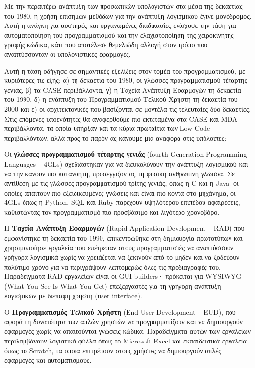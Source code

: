        Με την περαιτέρω ανάπτυξη των προσωπικών υπολογιστών στα μέσα της δεκαετίας του 1980, η χρήση επίσημων μεθόδων για την ανάπτυξη λογισμικού έγινε μονόδρομος. Αυτή η ανάγκη για αυστηρές και οργανωμένες διαδικασίες ενίσχυσε την τάση για αυτοματοποίηση του προγραμματισμού και την ελαχιστοποίηση της χειροκίνητης γραφής κώδικα, κάτι που αποτέλεσε θεμελιώδη αλλαγή στον τρόπο που αναπτύσσονταν οι υπολογιστικές εφαρμογές. \cite{Case1985, CASEChikofsky, MDELow}

        Αυτή η τάση οδήγησε σε σημαντικές εξελίξεις στον τομέα του προγραμματισμού, με κυριότερες τις εξής: α) τη δεκαετία του 1980, οι γλώσσες προγραμματισμού τέταρτης γενιάς, β) τα CASE περιβάλλοντα, γ) η Ταχεία Ανάπτυξη Εφαρμογών τη δεκαετία του 1990, δ) η ανάπτυξη του Προγραμματισμού Τελικού Χρήστη τη δεκαετία του 2000 και ε) οι αρχιτεκτονικές που βασίζονται σε μοντέλα τις τελευταίες δύο δεκαετίες. Στις επόμενες υποενότητες θα αναφερθούμε πιο εκτεταμένα στα CASE και MDA περιβάλλοντα, τα οποία υπήρξαν και τα κύρια πρωταίτια των Low-Code περιβαλλόντων, αλλά προς το παρόν ας κάνουμε μια αναφορά στις υπόλοιπες:

        Οι \textbf{γλώσσες προγραμματισμού τέταρτης γενιάς} (fourth-Generation Programming Languages -- 4GLs) σχεδιάστηκαν για να διευκολύνουν την ανάπτυξη λογισμικού και να την κάνουν πιο κατανοητή, προσεγγίζοντας τη φυσική ανθρώπινη γλώσσα. Σε αντίθεση με τις γλώσσες προγραμματισμού τρίτης γενιάς, όπως η C και η Java, οι οποίες απαιτούν πιο εξειδικευμένες γνώσεις και είναι πιο κοντά στο μηχάνημα, οι 4GLs όπως η Python, SQL και Ruby παρέχουν υψηλότερου επιπέδου αφαιρέσεις, καθιστώντας τον προγραμματισμό πιο προσβάσιμο και λιγότερο χρονοβόρο. \cite{wikipediaFourthgenerationProgramming}

        Η \textbf{Ταχεία Ανάπτυξη Εφαρμογών} (Rapid Application Development -- RAD) που εμφανίστηκε τη δεκαετία του 1990, επικεντρώθηκε στη δημιουργία πρωτοτύπων και χρησιμοποίησε εργαλεία που επέτρεπαν στους προγραμματιστές να αναπτύσσουν γρήγορα λογισμικά χωρίς να χρειάζεται να ξεκινούν από το μηδέν και να ξοδεύουν πολύτιμο χρόνο για να περιγράψουν λεπτομερώς όλες τις προδιαγραφές του. Παραδείγματα RAD εργαλείων είναι οι GUI builders· πρόκειται για WYSIWYG (What-You-See-Is-What-You-Get) επεξεργαστές για τη γρήγορη ανάπτυξη λογισμικών με διεπαφή χρήστη (user interface). \cite{wikipediaRapidApplication}

        Ο \textbf{Προγραμματισμός Τελικού Χρήστη} (End-User Development -- EUD), που αφορά τη δυνατότητα των απλών χρηστών να προγραμματίζουν και να δημιουργούν εφαρμογές χωρίς να απαιτούνται γνώσεις κώδικα. Παραδείγματα αυτών των εργαλείων περιλαμβάνουν λογιστικά φύλλα όπως το Microsoft Excel και εκπαιδευτικά εργαλεία όπως το Scratch, τα οποία επιτρέπουν στους χρήστες να δημιουργούν απλές εφαρμογές και αυτοματισμούς. \cite{wikipediaEnduserDevelopment}


